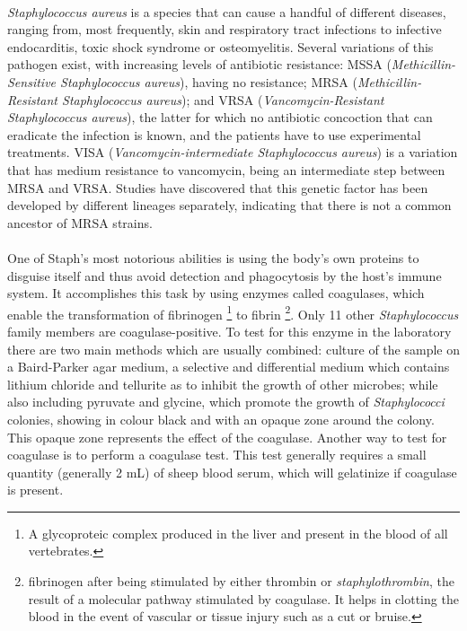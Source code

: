 \paragraph{}\emph{Staphylococcus aureus} is a species that can cause a handful of different diseases, ranging from, most frequently, skin and respiratory tract infections to infective endocarditis, toxic shock syndrome or osteomyelitis. Several variations of this pathogen exist, with increasing levels of antibiotic resistance: MSSA (\emph{Methicillin-Sensitive Staphylococcus aureus}), having no resistance; MRSA (\emph{Methicillin-Resistant Staphylococcus aureus}); and VRSA (\emph{Vancomycin-Resistant Staphylococcus aureus}), the   latter for which no antibiotic concoction that can eradicate the infection is known, and the patients have to use experimental treatments. VISA (\emph{Vancomycin-intermediate Staphylococcus aureus}) is a variation that has medium resistance to vancomycin, being an intermediate step between MRSA and VRSA. Studies have discovered that this genetic factor has been developed by different lineages separately, indicating that there is not a common ancestor of MRSA strains.
\paragraph{}One of Staph's most notorious abilities is using the body's own proteins to disguise itself and thus avoid detection and phagocytosis by the host's immune system. It accomplishes this task by using enzymes called coagulases, which enable the transformation of fibrinogen \footnote{A glycoproteic complex produced in the liver and present in the blood of all vertebrates.} to fibrin \footnote{fibrinogen after being stimulated by either thrombin or \emph{staphylothrombin}, the result of a molecular pathway stimulated by coagulase. It helps in clotting the blood in the event of vascular or tissue injury such as a cut or bruise. }\cite{murrayMicrobiologiaMedica2013}. Only 11 other \emph{Staphylococcus} family members are coagulase-positive. To test for this enzyme in the laboratory there are two main methods which are usually combined: culture of the sample on a Baird-Parker agar medium, a selective and differential medium which contains lithium chloride and tellurite as to inhibit the growth of other microbes; while also including pyruvate and glycine, which promote the growth of \emph{Staphylococci} colonies, showing in colour black and with an opaque zone around the colony. This opaque zone represents the effect of the coagulase. Another way to test for coagulase is to perform a coagulase test. This test generally requires a small quantity (generally 2 mL) of sheep blood serum, which will gelatinize if coagulase is present.
